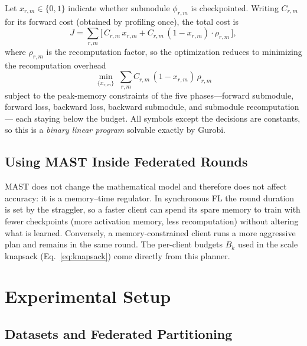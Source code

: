 \documentclass[sigconf]{acmart}
\begin{document}
Let $x_{r,m}\in\{0,1\}$ indicate whether submodule $\phi_{r,m}$ is checkpointed.
Writing $C_{r,m}$ for its forward cost (obtained by profiling once), the total
cost is
\begin{equation}
J=\sum_{r,m}\bigl[\,C_{r,m}\,x_{r,m} + C_{r,m}\,(1-x_{r,m})\cdot \rho_{r,m}\,\bigr],
\end{equation}
where $\rho_{r,m}$ is the recomputation factor, so the optimization reduces to
minimizing the recomputation overhead
\begin{equation}
\min_{\{x_{r,m}\}}\;\sum_{r,m} C_{r,m}\,(1-x_{r,m})\,\rho_{r,m}
\end{equation}
subject to the peak-memory constraints of the five phases---forward submodule,
forward loss, backward loss, backward submodule, and submodule recomputation---
each staying below the budget. All symbols except the decisions are constants,
so this is a \emph{binary linear program} solvable exactly by Gurobi.

\subsection{Using MAST Inside Federated Rounds}

MAST does not change the mathematical model and therefore does not affect
accuracy: it is a memory--time regulator. In synchronous FL the round duration is
set by the straggler, so a faster client can spend its spare memory to train with
fewer checkpoints (more activation memory, less recomputation) without altering
what is learned. Conversely, a memory-constrained client runs a more aggressive
plan and remains in the same round. The per-client budgets $B_k$ used in the
scale knapsack (Eq.~\eqref{eq:knapsack}) come directly from this planner.

\section{Experimental Setup}

\subsection{Datasets and Federated Partitioning}
\end{document}
